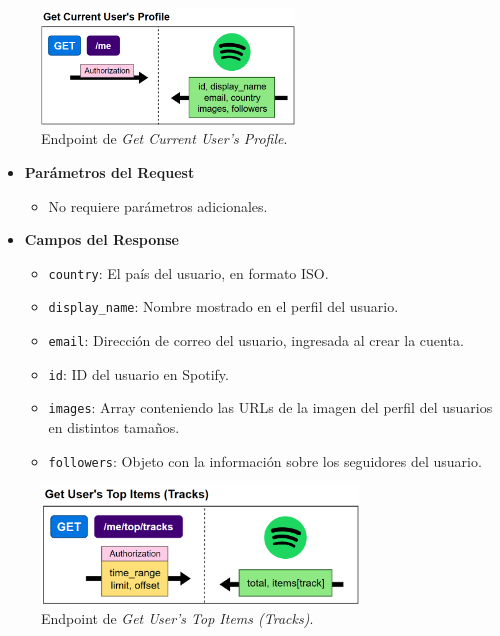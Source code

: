 \vspace{-7pt}
\begin{figure}[H]
    \centering
    \includegraphics[width=0.6\textwidth]{figures/endpoints/get_current_users_profile.png}
    \caption{Endpoint de \textit{Get Current User's Profile}.}
    \label{fig:get_current_usr_profile}
\end{figure}

\begin{itemize}
    \item \textbf{Parámetros del Request}
          \begin{itemize}
              \item No requiere parámetros adicionales.
          \end{itemize}
    \item \textbf{Campos del Response}
          \begin{itemize}
              \item \texttt{country}: El país del usuario, en formato ISO.
              \item \texttt{display\_name}: Nombre mostrado en el perfil del usuario.
              \item \texttt{email}: Dirección de correo del usuario, ingresada al crear la cuenta.
              \item \texttt{id}: ID del usuario en Spotify.
              \item \texttt{images}: Array conteniendo las URLs de la imagen del perfil del usuarios en distintos tamaños.
              \item \texttt{followers}: Objeto con la información sobre los seguidores del usuario.
          \end{itemize}
\end{itemize}

\vspace{-5pt}
\begin{figure}[H]
    \centering
    \includegraphics[width=0.75\textwidth]{figures/endpoints/get_users_top_items_tracks.png}
    \caption{Endpoint de \textit{Get User's Top Items (Tracks)}.}
    \label{fig:get_usr_top_items_tracks}
\end{figure}


